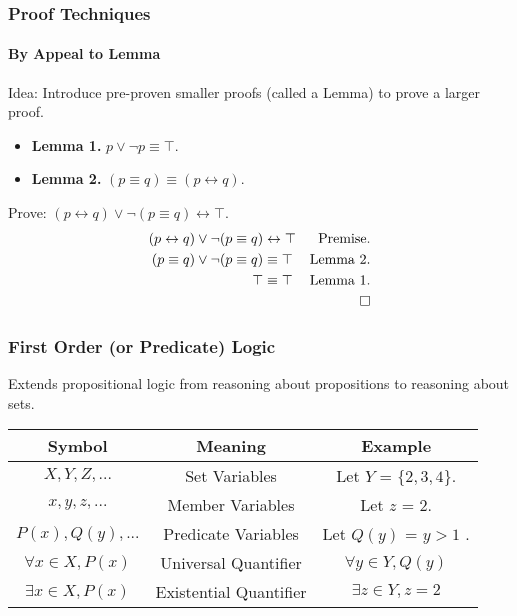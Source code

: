 \documentclass{beamer}
\begin{document}
\begin{frame}[fragile]
  \frametitle{Proof Techniques}
  \framesubtitle{By Appeal to Lemma}
  Idea: Introduce pre-proven smaller proofs (called a Lemma) to prove a larger
        proof. \\
  \begin{itemize}
    \item \textbf{Lemma 1.} $p \lor \lnot p \equiv \top$. \\
    \item \textbf{Lemma 2.} $(p \equiv q) \equiv (p \leftrightarrow q)$. 
  \end{itemize} 
  Prove: $(p \leftrightarrow q) \lor \lnot (p \equiv q) \leftrightarrow \top$.
  \begin{align*}
    (p \leftrightarrow q) \lor \lnot (p \equiv q) &\leftrightarrow \top
          &\text{Premise.} \\
    (p \equiv q) \lor \lnot (p \equiv q) &\equiv \top
          &\text{Lemma 2.} \\
    \top &\equiv \top &\text{Lemma 1.} \\
    & &\qed
  \end{align*}
\end{frame}

\begin{frame}
  \frametitle{First Order (or Predicate) Logic}
  Extends propositional logic from reasoning about propositions to reasoning
  about sets. \\
  \begin{tabular}{| c | c | c |}
  \hline
  \textbf{Symbol} & \textbf{Meaning} & \textbf{Example} \\
  \hline
  $X, Y, Z, ...$ & Set Variables & Let $Y$ = $\{2, 3, 4\}$. \\
  $x, y, z, ...$ & Member Variables & Let $z$ = 2.\\
  $P(x), Q(y), ...$ & Predicate Variables & Let $Q(y)$ = $y > 1$ .\\
  $\forall x \in X, P(x)$ & Universal Quantifier & $\forall y \in Y, Q(y)$ \\
  $\exists x \in X, P(x)$ & Existential Quantifier & $\exists z \in Y, z = 2$\\
  \hline
  \end{tabular}
\end{frame}
\end{document}
